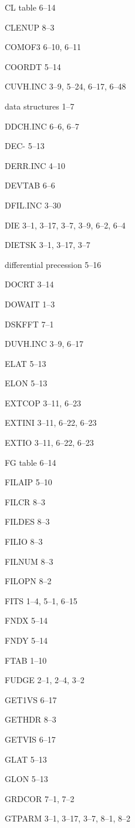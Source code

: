 \item CL table 6--14
\item CLENUP 8--3
\item COMOF3 6--10, 6--11
\item COORDT 5--14
\item CUVH.INC 3--9, 5--24, 6--17, 6--48
\item data structures 1--7
\item DDCH.INC 6--6, 6--7
\item DEC- 5--13
\item DERR.INC 4--10
\item DEVTAB 6--6
\item DFIL.INC 3--30
\item DIE 3--1, 3--17, 3--7, 3--9, 6--2, 6--4
\item DIETSK 3--1, 3--17, 3--7
\item differential precession 5--16
\item DOCRT 3--14
\item DOWAIT 1--3
\item DSKFFT 7--1
\item DUVH.INC 3--9, 6--17
\item ELAT 5--13
\item ELON 5--13
\item EXTCOP 3--11, 6--23
\item EXTINI 3--11, 6--22, 6--23
\item EXTIO 3--11, 6--22, 6--23
\item FG table 6--14
\item FILAIP 5--10
\item FILCR 8--3
\item FILDES 8--3
\item FILIO 8--3
\item FILNUM 8--3
\item FILOPN 8--2
\item FITS 1--4, 5--1, 6--15
\item FNDX 5--14
\item FNDY 5--14
\item FTAB 1--10
\item FUDGE 2--1, 2--4, 3--2
\item GET1VS 6--17
\item GETHDR 8--3
\item GETVIS 6--17
\item GLAT 5--13
\item GLON 5--13
\item GRDCOR 7--1, 7--2
\item GTPARM 3--1, 3--17, 3--7, 8--1, 8--2
